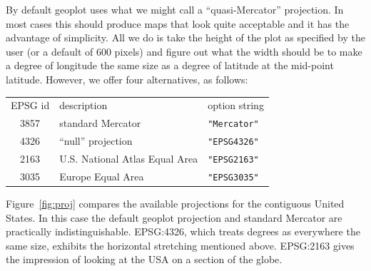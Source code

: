 \documentclass{article}
\begin{document}
By default geoplot uses what we might call a ``quasi-Mercator''
projection. In most cases this should produce maps that look quite
acceptable and it has the advantage of simplicity. All we do is take
the height of the plot as specified by the user (or a default of 600
pixels) and figure out what the width should be to make a degree of
longitude the same size as a degree of latitude at the mid-point
latitude. However, we offer four alternatives, as follows:
\begin{center}
  \begin{tabular}{cll}
    EPSG id & description & option string \\[4pt]
  \textsf{3857} & standard Mercator & \verb|"Mercator"| \\
  \textsf{4326} & ``null'' projection & \verb|"EPSG4326"| \\
  \textsf{2163} & U.S. National Atlas Equal Area &
     \verb|"EPSG2163"| \\
  \textsf{3035} & Europe Equal Area & \verb|"EPSG3035"|
\end{tabular}
\end{center}

Figure~\ref{fig:proj} compares the available projections for the
contiguous United States. In this case the default \textsf{geoplot}
projection and standard Mercator are practically
indistinguishable. \textsf{EPSG:4326}, which treats degrees as
everywhere the same size, exhibits the horizontal stretching mentioned
above. \textsf{EPSG:2163} gives the impression of looking at the USA
on a section of the globe.
\end{document}
